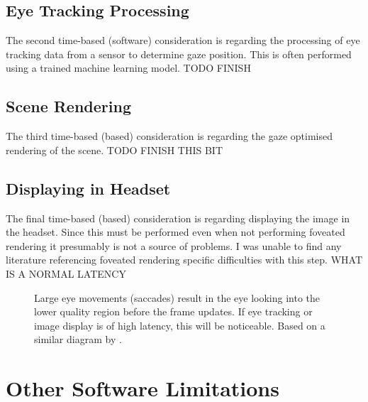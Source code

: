 \documentclass[a4paper,11pt]{article}
\begin{document}
\subsection{Eye Tracking Processing}
The second time-based (software) consideration is regarding the processing of eye tracking data from a sensor to determine gaze position. This is often performed using a trained machine learning model. TODO FINISH

\subsection{Scene Rendering}
The third time-based (based) consideration is regarding the gaze optimised rendering of the scene. TODO FINISH THIS BIT

\subsection{Displaying in Headset}
The final time-based (based) consideration is regarding displaying the image in the headset. Since this must be performed even when not performing foveated rendering it presumably is not a source of problems. I was unable to find any literature referencing foveated rendering specific difficulties with this step. WHAT IS A NORMAL LATENCY

\begin{figure}
  \begin{center}
    
    \caption{Large eye movements (saccades) result in the eye looking into the lower quality region before the frame updates. If eye tracking or image display is of high latency, this will be noticeable. Based on a similar diagram by \textcite{albert2017latency}.}
    \label{fig:eye}
  \end{center}
\end{figure}

\section{Other Software Limitations}
\end{document}

